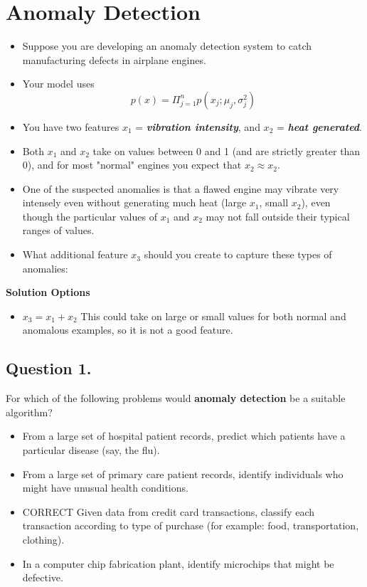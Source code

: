 \documentclass[11pt]{article} %
\begin{document}
\section*{Anomaly Detection}
\begin{itemize}
	\item Suppose you are developing an anomaly detection system to catch manufacturing defects in airplane engines. 
	\item Your model uses
	{ 
		\Large
		\[p(x)= \Pi ^{n}_{j=1} p(x_j;\mu_j,\sigma^2_j)\] 
	}
	\item You have two features $x_1$ = \textit{\textbf{vibration intensity}}, and $x_2$ = \textit{\textbf{heat generated}}. 
	\item Both $x_1$ and $x_2$ take on values between 0 and 1 (and are strictly greater than 0), and for most "normal" engines you expect that $x_2 \approx x_2$. 
	\item One of the suspected anomalies is that a flawed engine may vibrate very intensely even without generating much heat (large $x_1$, small $x_2$), 
	even though the particular values of $x_1$ and $x_2$ may not fall outside their typical ranges of values. 
	\item What additional feature $x_3$ should you create to capture these types of anomalies:
\end{itemize}
\textbf{Solution Options}
\begin{itemize}
	\item $x_3=x_1+x_2$	This could take on large or small values for both normal and anomalous examples, so it is not a good feature.
\end{itemize}


\subsection*{Question 1. }
For which of the following problems would \textbf{anomaly detection} be a suitable algorithm?

\begin{itemize}
	\item From a large set of hospital patient records, predict which patients have a particular disease (say, the flu).
	\item From a large set of primary care patient records, identify individuals who might have unusual health conditions.
	\item CORRECT
	Given data from credit card transactions, classify each transaction according to type of purchase (for example: food, transportation, clothing).
	\item 
	In a computer chip fabrication plant, identify microchips that might be defective.
\end{itemize}
\end{document}
